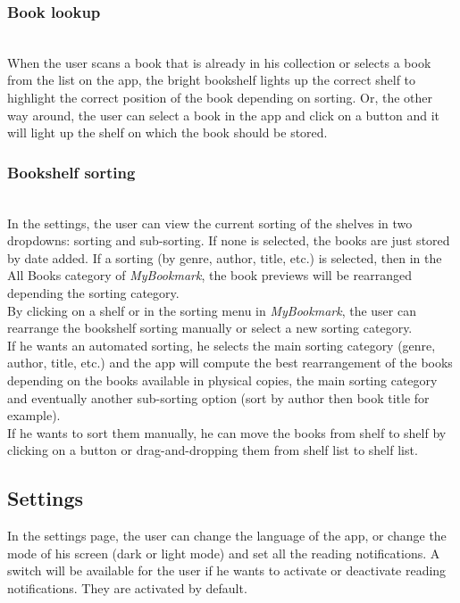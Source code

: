 \documentclass[conference]{IEEEtran}
\begin{document}
\subsubsection{Book lookup}\hfill\\
When the user scans a book that is already in his collection or selects a book from the list on the app, the bright bookshelf lights up the correct shelf to highlight the correct position of the book depending on sorting. Or, the other way around, the user can select a book in the app and click on a button and it will light up the shelf on which the book should be stored.\\

\subsubsection{Bookshelf sorting}\hfill\\
In the settings, the user can view the current sorting of the shelves in two dropdowns: sorting and sub-sorting. If none is selected, the books are just stored by date added. If a sorting (by genre, author, title, etc.) is selected, then in the All Books category of \textit{MyBookmark}, the book previews will be rearranged depending the sorting category.\\
By clicking on a shelf or in the sorting menu in \textit{MyBookmark}, the user can rearrange the bookshelf sorting manually or select a new sorting category. \\
If he wants an automated sorting, he selects the main sorting category (genre, author, title, etc.) and the app will compute the best rearrangement of the books depending on the books available in physical copies, the main sorting category and eventually another sub-sorting option (sort by author then book title for example).\\
If he wants to sort them manually, he can move the books from shelf to shelf by clicking on a button or drag-and-dropping them from shelf list to shelf list.\\


\subsection{Settings}\hfill

In the settings page, the user can change the language of the app, or change the mode of his screen (dark or light mode) and set all the reading notifications. A switch will be available for the user if he wants to activate or deactivate reading notifications. They are activated by default.\\
\end{document}
